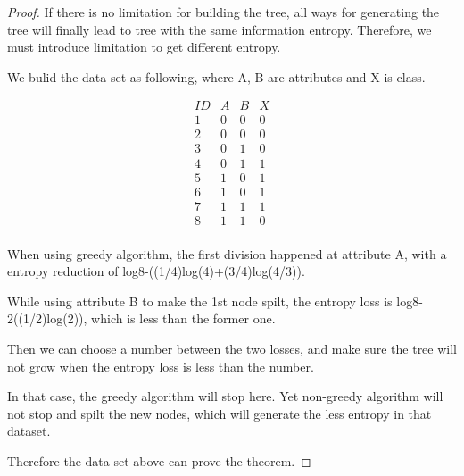 \documentclass{article} %
\newtheorem{proof}{Proof}
\begin{document}
\begin{proof}

If there is no limitation for building the tree, all ways for generating the tree will finally lead to tree with the same information entropy. Therefore, we must introduce limitation to get different entropy.

We bulid the data set as following, where A, B are attributes and X is class.

$$
  \begin{matrix}
   ID & A & B & X \\
   1 & 0 & 0 & 0 \\
   2 & 0 & 0 & 0 \\
   3 & 0 & 1 & 0 \\
   4 & 0 & 1 & 1 \\
   5 & 1 & 0 & 1 \\
   6 & 1 & 0 & 1 \\
   7 & 1 & 1 & 1 \\
   8 & 1 & 1 & 0 \\
  \end{matrix}
$$


When using greedy algorithm, the first division happened at attribute A, with a entropy reduction of log8-((1/4)log(4)+(3/4)log(4/3)).

While using attribute B to make the 1st node spilt, the entropy loss is log8-2((1/2)log(2)), which is less than the former one.

Then we can choose a number between the two losses, and make sure the tree will not grow when the entropy loss is less than the number.

In that case, the greedy algorithm will stop here. Yet non-greedy algorithm will not stop and spilt the new nodes, which will generate the less entropy in that dataset.

Therefore the data set above can prove the theorem.

\end{proof}
\end{document}
